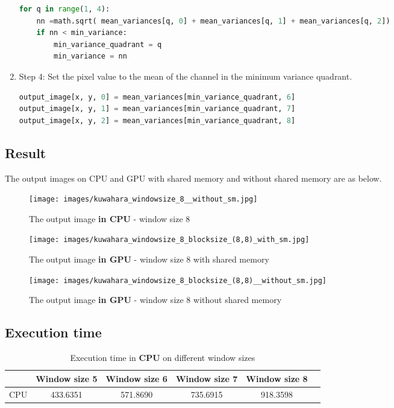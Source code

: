 \documentclass[12pt]{article}
\begin{document}
\begin{enumerate}
\begin{lstlisting}[language=Python]
for q in range(1, 4):
    nn =math.sqrt( mean_variances[q, 0] + mean_variances[q, 1] + mean_variances[q, 2])
    if nn < min_variance:
        min_variance_quadrant = q
        min_variance = nn
    \end{lstlisting}
    \item Step 4: Set the pixel value to the mean of the channel in the minimum variance quadrant.
    \begin{lstlisting}[language=Python]
output_image[x, y, 0] = mean_variances[min_variance_quadrant, 6]
output_image[x, y, 1] = mean_variances[min_variance_quadrant, 7]
output_image[x, y, 2] = mean_variances[min_variance_quadrant, 8]
    \end{lstlisting}
\end{enumerate}
\subsection{Result}
The output images on CPU and GPU with shared memory and without shared memory are as below.
\begin{figure}[H]
\centering
    \texttt{[image: images/kuwahara\_windowsize\_8\_\_without\_sm.jpg]}
    \caption{The output image \textbf{in CPU} - window size 8}
\end{figure}
\begin{figure}[H]
\centering
    \texttt{[image: images/kuwahara\_windowsize\_8\_blocksize\_(8,8)\_with\_sm.jpg]}
    \caption{The output image \textbf{in GPU} - window size 8 with shared memory}
\end{figure}
\begin{figure}[H]
\centering
    \texttt{[image: images/kuwahara\_windowsize\_8\_blocksize\_(8,8)\_\_without\_sm.jpg]}
    \caption{The output image \textbf{in GPU} - window size 8 without shared memory}
\end{figure}
\subsection{Execution time}
\begin{table}[H]
    \centering
    \begin{tabular}{|c|c|c|c|c|c|}
        \hline
         & Window size 5 & Window size 6 & Window size 7 & Window size 8 \\ 
        \hline
        CPU  & 433.6351 & 571.8690 & 735.6915 & 918.3598\\ 
        \hline
    \end{tabular}
    \caption{Execution time in \textbf{CPU } on different window sizes}
    \label{tab:mytable}
\end{table}
\end{document}
